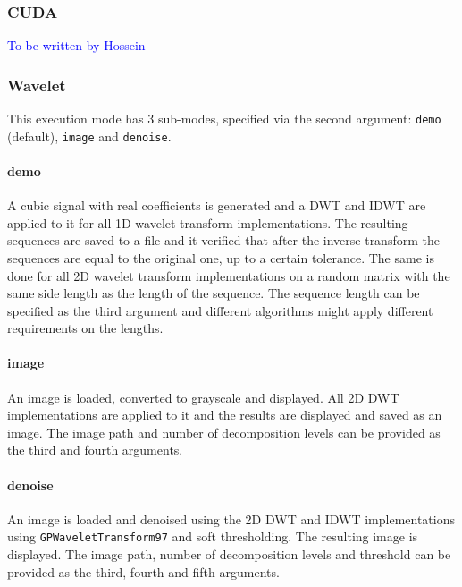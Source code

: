 \subsubsection{CUDA}
\textcolor{blue}{To be written by Hossein}

\subsubsection{Wavelet}
This execution mode has 3 sub-modes, specified via the second argument: \texttt{demo} (default), \texttt{image} and \texttt{denoise}.
\paragraph{demo} A cubic signal with real coefficients is generated and a DWT and IDWT are applied to it for all 1D wavelet transform implementations. The resulting sequences are saved to a file and it verified that after the inverse transform the sequences are equal to the original one, up to a certain tolerance. The same is done for all 2D wavelet transform implementations on a random matrix with the same side length as the length of the sequence. The sequence length can be specified as the third argument and different algorithms might apply different requirements on the lengths.
\paragraph{image} An image is loaded, converted to grayscale and displayed. All 2D DWT implementations are applied to it and the results are displayed and saved as an image. The image path and number of decomposition levels can be provided as the third and fourth arguments.
\paragraph{denoise} An image is loaded and denoised using the 2D DWT and IDWT implementations using \texttt{GPWaveletTransform97} and soft thresholding. The resulting image is displayed. The image path, number of decomposition levels and threshold can be provided as the third, fourth and fifth arguments.

